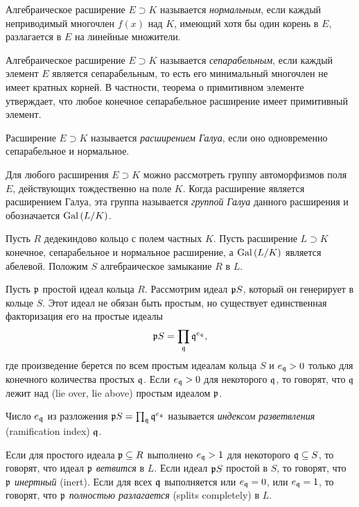 \documentclass[_00_dissertation.tex]{subfiles}
\begin{document}
\begin{definition}
    Алгебраическое расширение $E \supset K$ называется \emph{нормальным}, если каждый неприводимый многочлен $f(x)$ над $K$, имеющий хотя бы один корень в $E$, разлагается в $E$ на линейные множители.

    Алгебраическое расширение $E \supset K$ называется \emph{сепарабельным}, если каждый элемент $E$ является сепарабельным, то есть его минимальный многочлен не имеет кратных корней.
    В частности, теорема о примитивном элементе утверждает, что любое конечное сепарабельное расширение имеет примитивный элемент.
    
    Расширение $E \supset K$ называется \emph{расширением Галуа}, если оно одновременно сепарабельное и нормальное.

    Для любого расширения $E \supset K$ можно рассмотреть группу автоморфизмов поля $E$, действующих тождественно на поле $K$.
    Когда расширение является расширением Галуа, эта группа называется \emph{группой Галуа} данного расширения и обозначается $\textrm{Gal}\left(L/K\right)$.
\end{definition}

Пусть $R$ дедекиндово кольцо с полем частных $K$.
Пусть расширение $L \supset K$ конечное, сепарабельное и нормальное расширение, а $\textrm{Gal}\left(L/K\right)$ является абелевой.
Положим $S$ алгебраическое замыкание $R$ в $L$.

\begin{definition}
    Пусть $\mathfrak{p}$ простой идеал кольца $R$.
    Рассмотрим идеал $\mathfrak{p}S$, который он генерирует в кольце $S$.
    Этот идеал не обязан быть простым, но существует единственная факторизация его на простые идеалы
    \begin{equation*}
        \mathfrak{p}S = \prod_{\mathfrak{q}} \mathfrak{q}^{e_{\mathfrak{q}}},
    \end{equation*}
    где произведение берется по всем простым идеалам кольца $S$ и $e_{\mathfrak{q}} > 0$ только для конечного количества простых $\mathfrak{q}$.
    Если $e_{\mathfrak{q}} > 0$ для некоторого $\mathfrak{q}$, то говорят, что $\mathfrak{q}$ лежит над (lie over, lie above) простым идеалом $\mathfrak{p}$.

    Число $e_{\mathfrak{q}}$ из разложения $\mathfrak{p}S = \prod_{\mathfrak{q}} \mathfrak{q}^{e_{\mathfrak{q}}}$ называется \emph{индексом разветвления} (ramification index) $\mathfrak{q}$.

    Если для простого идеала $\mathfrak{p} \subseteq R$ выполнено $e_{\mathfrak{q}} > 1$ для некоторого $\mathfrak{q} \subseteq S$, то говорят, что идеал $\mathfrak{p}$ \emph{ветвится} в $L$.
    Если идеал $\mathfrak{p}S$ простой в $S$, то говорят, что $\mathfrak{p}$ \emph{инертный} (inert).
    Если для всех $\mathfrak{q}$ выполняется или $e_{\mathfrak{q}} = 0$, или $e_{\mathfrak{q}} = 1$, то говорят, что $\mathfrak{p}$ \emph{полностью разлагается} (splits completely) в $L$.
\end{definition}
\end{document}
